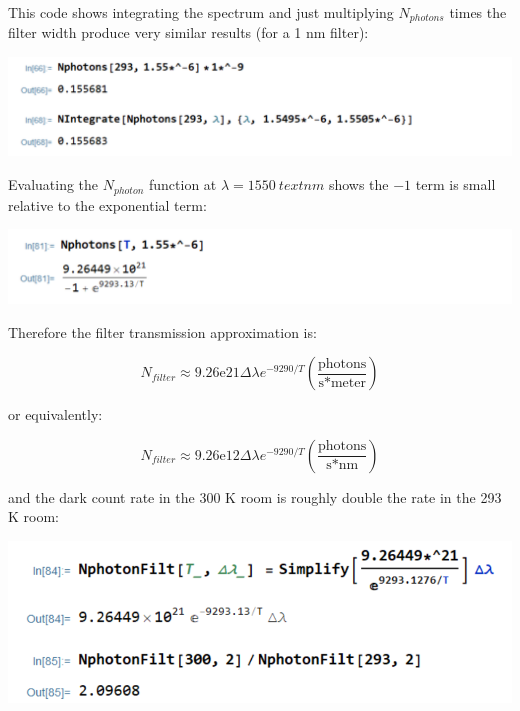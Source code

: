 \documentclass[11pt]{caltech_thesis} %
\begin{document}
\begin{enumerate}
{  }

  {\color{midnightblue} This code shows integrating the spectrum and
  just multiplying \(N_{photons}\) times the filter width produce very
  similar results (for a 1 nm filter):}

  {\color{midnightblue} \includegraphics{chapter_05/figs_05/nphoton_approx.PNG}}

  {\color{midnightblue} Evaluating the \(N_{photon}\) function at
  \(\lambda = 1550~text{nm}\) shows the \(-1\) term is small relative to
  the exponential term:}

  {\color{midnightblue} \includegraphics{chapter_05/figs_05/small_relative_to_exponential.PNG}}

  {\color{midnightblue} Therefore the filter transmission approximation
  is:}

  {\color{midnightblue} 

  \[\boxed{N_{filter} \approx 9.26\mathrm{e}21 \Delta\lambda e^{-9290/T} (\frac{\text{photons}}{\text{s*meter}})}\]

  }

  {\color{midnightblue} or equivalently: }

  {\color{midnightblue} 

  \[\boxed{N_{filter} \approx 9.26\mathrm{e}12 \Delta\lambda e^{-9290/T} (\frac{\text{photons}}{\text{s*nm}})}\]

  }

  {\color{midnightblue} and the dark count rate in the 300 K room is
  roughly double the rate in the 293 K room: }

  {\color{midnightblue} \includegraphics{chapter_05/figs_05/filter_with_temp.PNG}}


\end{enumerate}
\end{document}
